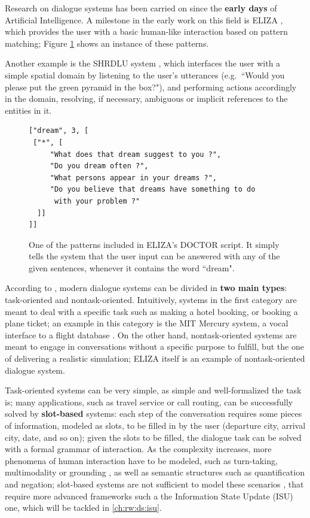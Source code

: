 Research on dialogue systems has been carried on since the \textbf{early days} of Artificial Intelligence. A milestone in the early work on this field is ELIZA \citep{Weizenbaum:1966:ECP:365153.365168}, which provides the user with a basic human-like interaction based on pattern matching; Figure \ref{ch:rw:ds:ELIZA} shows an instance of these patterns.

Another example is the SHRDLU system \citep{winograd1971procedure}, which interfaces the user with a simple spatial domain by listening to the user's utterances (e.g.\ ``Would you please put the green pyramid in the box?"), and performing actions accordingly in the domain, resolving, if necessary, ambiguous or implicit references to the entities in it.

\begin{figure}
\begin{Verbatim}[frame=single]
["dream", 3, [
 ["*", [
     "What does that dream suggest to you ?",
     "Do you dream often ?",
     "What persons appear in your dreams ?",
     "Do you believe that dreams have something to do
      with your problem ?"
  ]]
]]
\end{Verbatim}
\caption{One of the patterns included in ELIZA's DOCTOR script. It simply tells the system that the user input can be answered with any of the given sentences, whenever it contains the word ``dream".}
\label{ch:rw:ds:ELIZA}
\end{figure}

According to \cite{Jokinen2009}, modern dialogue systems can be divided in \textbf{two main types}: task-oriented and nontask-oriented. Intuitively, systems in the first category are meant to deal with a specific task such as making a hotel booking, or booking a plane ticket; an example in this category is the MIT Mercury system, a vocal interface to a flight database \citep{Seneff:2000:DMM:1605285.1605288}. On the other hand, nontask-oriented systems are meant to engage in conversations without a specific purpose to fulfill, but the one of delivering a realistic simulation; ELIZA itself is an example of nontask-oriented dialogue system.

Task-oriented systems can be very simple, as simple and well-formalized the task is;  many applications, such as travel service or call routing, can be successfully solved by \textbf{slot-based} systems: each step of the conversation requires some pieces of information, modeled as slots, to be filled in by the user (departure city, arrival city, date, and so on); given the slots to be filled, the dialogue task can be solved with a formal grammar of interaction. As the complexity increases, more phenomena of human interaction have to be modeled, such as turn-taking, multimodality or grounding
, as well as semantic structures such as quantification and negation; slot-based systems are not sufficient to model these scenarios \citep{Gabsdil03clarificationin}, that require more advanced frameworks such a the Information State Update (ISU) one, which will be tackled in \ref{ch:rw:ds:isu}.


